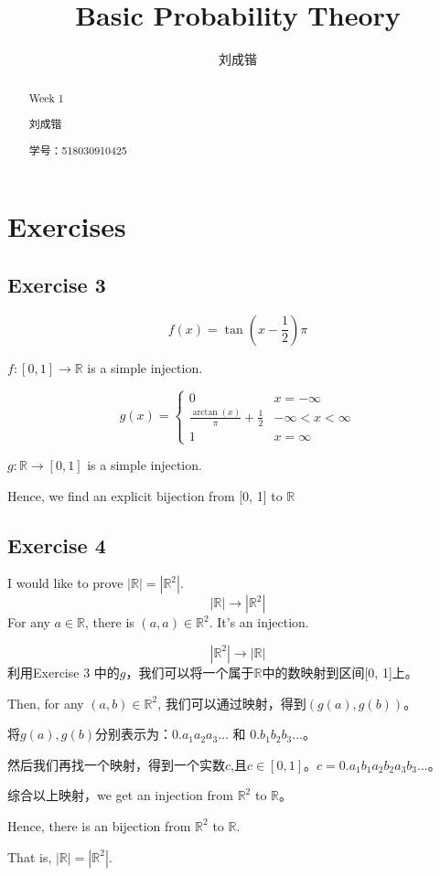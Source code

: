\documentclass{ximera}
\title{Basic Probability Theory}
\author{刘成锴}
\begin{document}
	
\begin{abstract}
	Week 1
	
	刘成锴
	
	学号：518030910425
\end{abstract}
\maketitle

\section{Exercises}

\subsection{Exercise 3}
	
\begin{solution}
	$$
	f(x) = \tan({x - \frac{1}{2}})\pi
	$$
	
	$f:[0, 1] \rightarrow \mathbb{R}$ is a simple injection.
	
	$$
	g(x)=\left\{
	\begin{array}{lc}
	0 & x = -\infty \\ 
	\frac{\arctan(x)}{\pi} + \frac{1}{2} & -\infty < x < \infty \\ 
	1 & x = \infty
	\end{array}\right.
	$$
	
	$g:\mathbb{R} \rightarrow [0, 1]$ is a simple injection.
	
	Hence, we find an explicit bijection from [0, 1] to $\mathbb{R}$
\end{solution}

\subsection{Exercise 4}
\begin{solution}
	I would like to prove $ |\mathbb{R}| = |\mathbb{R}^2| $.
	$$
	|\mathbb{R}| \rightarrow |\mathbb{R}^2|
	$$
	For any $a \in \mathbb{R}$, there is $(a, a) \in \mathbb{R}^2$. It's an injection.
	
	$$
	|\mathbb{R}^2| \rightarrow |\mathbb{R}|
	$$
	利用Exercise 3 中的$g$，我们可以将一个属于$\mathbb{R}$中的数映射到区间[0, 1]上。
	
	Then, for any $(a, b) \in \mathbb{R}^2$, 我们可以通过映射，得到$(g(a), g(b))$。
	
	将$g(a), g(b)$分别表示为：$0.a_1a_2a_3...$ 和 $0.b_1b_2b_3...$。
	
	然后我们再找一个映射，得到一个实数$c$,且$c \in [0, 1]$。$c = 0.a_1b_1a_2b_2a_3b_3...$。
	
	综合以上映射，we get an injection from $\mathbb{R}^2$ to $\mathbb{R}$。
	
	Hence, there is an bijection from $\mathbb{R}^2$ to $\mathbb{R}$.
	
	That is, $ |\mathbb{R}| = |\mathbb{R}^2|$.
	
\end{solution}
	
\end{document}
